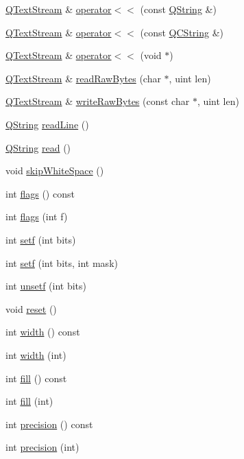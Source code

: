 \begin{DoxyCompactItemize}
\mbox{\hyperlink{class_q_text_stream}{Q\+Text\+Stream}} \& \mbox{\hyperlink{class_q_text_stream_a71fe2107025a308c699e666522a83b8f}{operator$<$$<$}} (const \mbox{\hyperlink{class_q_string}{Q\+String}} \&)
\item 
\mbox{\hyperlink{class_q_text_stream}{Q\+Text\+Stream}} \& \mbox{\hyperlink{class_q_text_stream_a8fca116d77fdc9359d44e1d3c4aade70}{operator$<$$<$}} (const \mbox{\hyperlink{class_q_c_string}{Q\+C\+String}} \&)
\item 
\mbox{\hyperlink{class_q_text_stream}{Q\+Text\+Stream}} \& \mbox{\hyperlink{class_q_text_stream_a2ec702def0e5ee2c6167cc7accfb8119}{operator$<$$<$}} (void $\ast$)
\item 
\mbox{\hyperlink{class_q_text_stream}{Q\+Text\+Stream}} \& \mbox{\hyperlink{class_q_text_stream_a5320c9f2058d72a264aa2152cc69852e}{read\+Raw\+Bytes}} (char $\ast$, uint len)
\item 
\mbox{\hyperlink{class_q_text_stream}{Q\+Text\+Stream}} \& \mbox{\hyperlink{class_q_text_stream_ac92bd94165a60152f12905deed163189}{write\+Raw\+Bytes}} (const char $\ast$, uint len)
\item 
\mbox{\hyperlink{class_q_string}{Q\+String}} \mbox{\hyperlink{class_q_text_stream_a0bed0242d7c3f17289df88fdecad6afa}{read\+Line}} ()
\item 
\mbox{\hyperlink{class_q_string}{Q\+String}} \mbox{\hyperlink{class_q_text_stream_a1c74ba05c6e63e88303852e07dbbcaa3}{read}} ()
\item 
void \mbox{\hyperlink{class_q_text_stream_a0c8656a473fe2b6e26c459e5840e7d07}{skip\+White\+Space}} ()
\item 
int \mbox{\hyperlink{class_q_text_stream_ab6cf395446ba04973dff067ab8b36978}{flags}} () const
\item 
int \mbox{\hyperlink{class_q_text_stream_a280a244baaf87d825ec50bd83c14488c}{flags}} (int f)
\item 
int \mbox{\hyperlink{class_q_text_stream_adb71ee168e670b470bcbc547b994c5df}{setf}} (int bits)
\item 
int \mbox{\hyperlink{class_q_text_stream_a9d039c1d26bfd52f47b4595dc30a628a}{setf}} (int bits, int mask)
\item 
int \mbox{\hyperlink{class_q_text_stream_a7f7cb71e79749c7d13217dec5599e627}{unsetf}} (int bits)
\item 
void \mbox{\hyperlink{class_q_text_stream_ac92d855fc3fa8b5d1c7421e2a0654a83}{reset}} ()
\item 
int \mbox{\hyperlink{class_q_text_stream_a2ac246266f7cdeb3e14c2964c369fa86}{width}} () const
\item 
int \mbox{\hyperlink{class_q_text_stream_a359d4bd2600d1169fb5c667e23c03f76}{width}} (int)
\item 
int \mbox{\hyperlink{class_q_text_stream_a485699c07b1ea6104a84627876cc2cd9}{fill}} () const
\item 
int \mbox{\hyperlink{class_q_text_stream_a36c4e45d5090252b3a0e335fd98f66d1}{fill}} (int)
\item 
int \mbox{\hyperlink{class_q_text_stream_a180cd0f2bd8796ba012d338537a2005b}{precision}} () const
\item 
int \mbox{\hyperlink{class_q_text_stream_afed018ad42135061a188a45d265516ad}{precision}} (int)
\end{DoxyCompactItemize}
